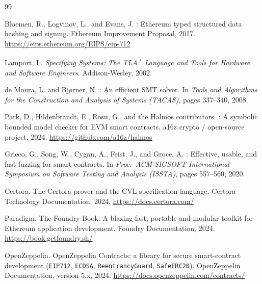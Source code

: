 \documentclass[11pt,a4paper]{article}
\theoremstyle{definition}
\theoremstyle{remark}
\begin{document}

\begin{thebibliography}{99}

Bloemen, R., Logvinov, L., and Evans, J.
: Ethereum typed structured data hashing and signing.
\newblock Ethereum Improvement Proposal, 2017.
\newblock \url{https://eips.ethereum.org/EIPS/eip-712}

Lamport, L.
\newblock \emph{Specifying Systems: The TLA\textsuperscript{+} Language
  and Tools for Hardware and Software Engineers}.
\newblock Addison-Wesley, 2002.

de Moura, L. and Bj{\o}rner, N.
: An efficient {SMT} solver.
\newblock In \emph{Tools and Algorithms for the Construction and
  Analysis of Systems (TACAS)}, pages 337--340, 2008.

Park, D., Hildenbrandt, E., Rosu, G., and the Halmos contributors.
: A symbolic bounded model checker for {EVM}
  smart contracts.
\newblock a16z crypto / open-source project, 2024.
\newblock \url{https://github.com/a16z/halmos}

Grieco, G., Song, W., Cygan, A., Feist, J., and Groce, A.
: Effective, usable, and fast fuzzing for smart
  contracts.
\newblock In \emph{Proc.\ ACM SIGSOFT International Symposium on
  Software Testing and Analysis (ISSTA)}, pages 557--560, 2020.

Certora.
\newblock The {Certora} prover and the {CVL} specification language.
\newblock Certora Technology Documentation, 2024.
\newblock \url{https://docs.certora.com/}

Paradigm.
\newblock The {Foundry Book}: A blazing-fast, portable and modular
  toolkit for {Ethereum} application development.
\newblock Foundry Documentation, 2024.
\newblock \url{https://book.getfoundry.sh/}

OpenZeppelin.
\newblock OpenZeppelin Contracts: a library for secure smart-contract
  development (\texttt{EIP712}, \texttt{ECDSA}, \texttt{ReentrancyGuard},
  \texttt{SafeERC20}).
\newblock OpenZeppelin Documentation, version 5.x, 2024.
\newblock \url{https://docs.openzeppelin.com/contracts/}

\end{thebibliography}
\end{document}
